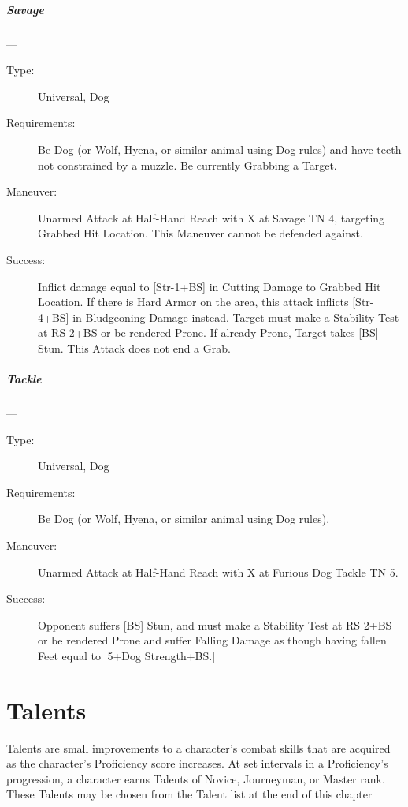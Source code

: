 \documentclass[oneside,11pt,english]{book}
\begin{document}
\paragraph{\large\label{man:Savage}Savage}---\quad{\large[X]}
\vspace{-10pt}\begin{description} 
\item [Type:] Universal, Dog 
\item [Requirements:] Be Dog (or Wolf, Hyena, or similar animal using Dog rules) and have teeth not 
constrained by a muzzle. Be currently Grabbing a Target. 
\item [Maneuver:] Unarmed Attack at Half-Hand Reach with X at Savage TN 4, targeting Grabbed Hit 
Location. This Maneuver cannot be defended against. 
\item [Success:] Inflict damage equal to [Str-1+BS] in Cutting Damage to Grabbed Hit Location. If there is Hard 
Armor on the area, this attack inflicts [Str-4+BS] in Bludgeoning Damage instead. Target must make a 
Stability Test at RS 2+BS or be rendered Prone. If already Prone, Target takes [BS] Stun. 
This Attack does not end a Grab. 
\end{description}
\paragraph{\large\label{man:Tackle}Tackle}---\quad{\large[2+X]}
\vspace{-10pt}\begin{description} 
\item [Type:] Universal, Dog 
\item [Requirements:] Be Dog (or Wolf, Hyena, or similar animal using Dog rules). 
\item [Maneuver:] Unarmed Attack at Half-Hand Reach with X at Furious Dog Tackle TN 5. 
\item [Success:] Opponent suffers [BS] Stun, and must make a Stability Test at RS 2+BS or be rendered Prone 
and suffer Falling Damage as though having fallen Feet equal to [5+Dog Strength+BS.] 
\end{description}

\chapter{Talents}\label{ch:Talents} %
\startcontents[chapters]
\clearpage
Talents are small improvements to a character’s combat skills that are acquired as the character’s Proficiency score increases. At set intervals in a Proficiency’s progression, a character earns Talents of Novice, Journeyman, or Master rank. These Talents may be chosen from the Talent list at the end of this chapter
\end{document}

